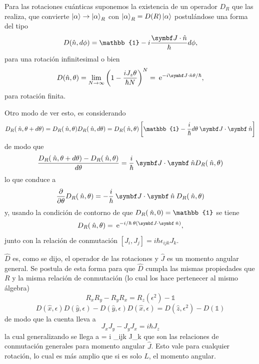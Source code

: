 \documentclass[10pt,oneside]{CBFT_book}
\begin{document}
Para las rotaciones cuánticas suponemos la existencia de un operador $D_R$ que las realiza, que
convierte $ \Ket{\alpha} \to \Ket{\alpha}_R $ con $ \Ket{\alpha}_R = D(R) \Ket{\alpha} $ postulándose una forma del
tipo 
\[
	D(\hat{n},d\phi) = \mathbb{1} - i \frac{\vb{J}\cdot\hat{n}}{\hbar}d\phi,
\]
para una rotación infinitesimal o bien
\[
	D(\hat{n},\theta) = \lim_{N\to\infty} \left( 1 - \frac{i J_z \theta}{\hbar N} \right)^N =
	\euler^{-i \vb{J}\cdot\hat{n} \theta / \hbar },
\]
para rotación finita. 

Otro modo de ver esto, es considerando 
\[
	D_R(\nver,\theta + d\theta) = D_R(\nver,\theta) D_R(\nver,d\theta) 
	= D_R(\nver,\theta) \left[ \mathbb{1} - \frac{i}{\hbar} d\theta \: \pe{J}{\nver}\right]
\]
de modo que
\[
	\frac{ D_R(\nver,\theta + d\theta) -D_R(\nver,\theta) }{d\theta} = 
	\frac{i}{\hbar} \:\pe{J}{\nver} D_R(\nver,\theta) 
\]
lo que conduce a
\[
	\dpar{}{\theta} D_R(\nver,\theta) = - \frac{i}{\hbar} \:\pe{J}{\nver} \: D_R(\nver,\theta)
\]
y, usando la condición de contorno de que $D_R(\nver,0) = \mathbb{1}$ se tiene
\[
	D_R(\nver,\theta) = \euler^{-i /\hbar \: \theta (\pe{J}{\nver}) },
\]
junto con la relación de conmutación $ [J_i, J_j] = i \hbar \epsilon_{ijk} J_k $.

$\hat{D}$ es, como se dijo, el operador de las rotaciones y $\hat{J}$ es un momento angular 
general. Se postula de esta forma para que $\hat{D}$ cumpla las mismas propiedades que $R$ y la 
misma relación de conmutación (lo cual los hace pertenecer al mismo álgebra)
\[
	R_x R_y - R_y R_x = R_z (\epsilon^2) - \mathbb{1}
\]
\[
	D(\hat{x},\epsilon) D(\hat{y},\epsilon) - D(\hat{y},\epsilon) D(\hat{x},\epsilon) =
	D(\hat{z},\epsilon^2) - D(\mathbb{1})
\]
de modo que la cuenta lleva a  
\[
	J_x J_y - J_y J_x = i \hbar J_z
\]
la cual generalizando se llega a 
\be
	[J_i,J_j] = i \hbar \epsilon_{ijk} J_k
	\label{conmutacion_J}
\ee
que son las relaciones de conmutación generales para momento angular $\hat{J}$.
Esto vale para cualquier rotación, lo cual es más amplio que si es solo $L$, el momento angular.
\end{document}
